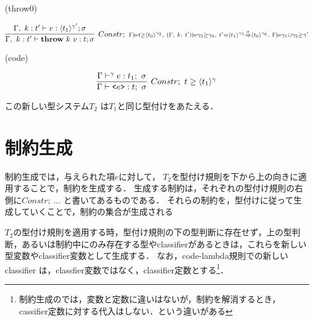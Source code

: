 (throw0)

\[
  \infer[Constr;~ {\scriptstyle \Gamma \models \longer{t}{\codeT{t_0}{\gamma_2}},~ (\Gamma,~ k:~t') \models \gamma_2 \ord \gamma_0,~  t' = \contT{\codeT{t_1}{\gamma_1}}{\codeT{t_0}{\gamma_0}}{\sigma},~ \Gamma \models \gamma_1 \uni \gamma_2 \ord \gamma'}]
  {\Gamma,~ k:t'
    \vdash \throw{k}{v} : t ; \sigma}
  {\Gamma,~ k:t'
    \vdash v : \codeT{t_1}{\gamma'} ; \sigma
  }
\]

(code)

\[
  \infer[Constr;~\longer{t}{\codeT{t_1}{\gamma}}]
  {\Gamma \vdash \code{e} : t;~\sigma}
  {\Gamma \vdash^\gamma e : t_1;~\sigma}
\]


この新しい型システム$T_2$ は$T_1$と同じ型付けをあたえる．

\section{制約生成}

制約生成では，与えられた項$e$に対して，
$T_2$を型付け規則を下から上の向きに適用することで，制約を生成する．
生成する制約は，それぞれの型付け規則の右側に$Constr;~ ...$ と書いてあるものである．
それらの制約を，型付けに従って生成していくことで，制約の集合が生成される

$T_2$の型付け規則を適用する時，型付け規則の下の型判断に存在せず，上の型判断，あるいは制約中にのみ存在する型やclassifierがあるときは，これらを新しい型変数やclassifier変数として生成する．
なお，code-lambda規則での新しいclassifier は，classfier変数ではなく，classifier定数とする\footnote{制約生成のでは，変数と定数に違いはないが，制約を解消するとき，cassifier定数に対する代入はしない．という違いがある}．

